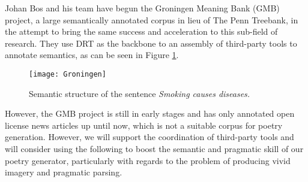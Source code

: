 Johan Bos and his team have begun the Groningen Meaning Bank (GMB) project\cite{BasileBosEvangVenhuizen2012LREC}, a large semantically annotated corpus in lieu of The Penn Treebank, in the attempt to bring the same success and acceleration to this sub-field of research. They use DRT as the backbone to an assembly of third-party tools to annotate semantics, as can be seen in Figure \ref{fig:gmb}.

\begin{figure}[h!]
\centering
\texttt{[image: Groningen]}
\caption{Semantic structure of the sentence \textit{Smoking causes diseases.}}
\label{fig:gmb}
\end{figure}

However, the GMB project is still in early stages and has only annotated open license news articles up until now, which is not a suitable corpus for poetry generation. However, we will support the coordination of third-party tools and will consider using the following to boost the semantic and pragmatic skill of our poetry generator, particularly with regards to the problem of producing vivid imagery and pragmatic parsing.
